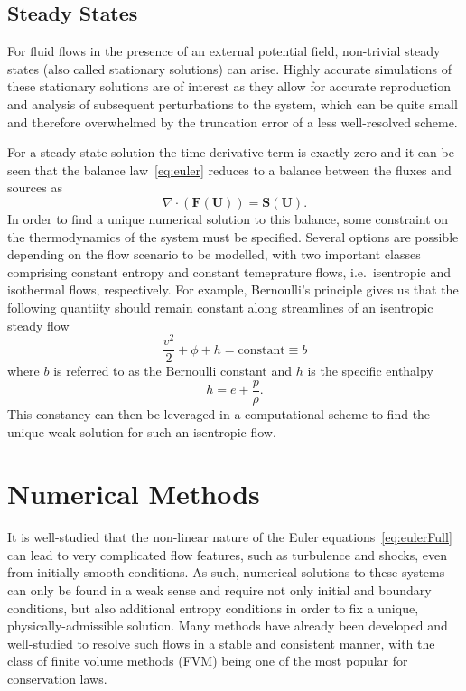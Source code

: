 \subsection{Steady States}

For fluid flows in the presence of an external potential field, non-trivial steady states (also called stationary solutions) can arise. Highly accurate simulations of these stationary solutions are of interest as they allow for accurate reproduction and analysis of subsequent perturbations to the system, which can be quite small and therefore overwhelmed by the truncation error of a less well-resolved scheme.

For a steady state solution the time derivative term is exactly zero and it can be seen that the balance law~\eqref{eq:euler} reduces to a balance between the fluxes and sources as
\begin{equation} \label{eq:balance}
\nabla\cdot(\mathbf{F}(\mathbf{U}))=\mathbf{S}(\mathbf{U}).
\end{equation}
In order to find a unique numerical solution to this balance, some constraint on the thermodynamics of the system must be specified. Several options are possible depending on the flow scenario to be modelled, with two important classes comprising constant entropy and constant temeprature flows, i.e.~isentropic and isothermal flows, respectively. For example, Bernoulli's principle gives us that the following quantiity should remain constant along streamlines of an isentropic steady flow
\begin{equation}
\frac{v^2}{2}+\phi+h=\textrm{constant}\equiv b
\end{equation}
where $b$ is referred to as the Bernoulli constant and $h$ is the specific enthalpy
\begin{equation} \label{eq:enthalpy}
h=e+\frac{p}{\rho}.
\end{equation}
This constancy can then be leveraged in a computational scheme to find the unique weak solution for such an isentropic flow.


\section{Numerical Methods}
\label{sec:numerics}

It is well-studied that the non-linear nature of the Euler equations~\eqref{eq:eulerFull} can lead to very complicated flow features, such as turbulence and shocks, even from initially smooth conditions. As such, numerical solutions to these systems can only be found in a weak sense and require not only initial and boundary conditions, but also additional entropy conditions in order to fix a unique, physically-admissible solution. Many methods have already been developed and well-studied to resolve such flows in a stable and consistent manner, with the class of finite volume methods (FVM) being one of the most popular for conservation laws.

